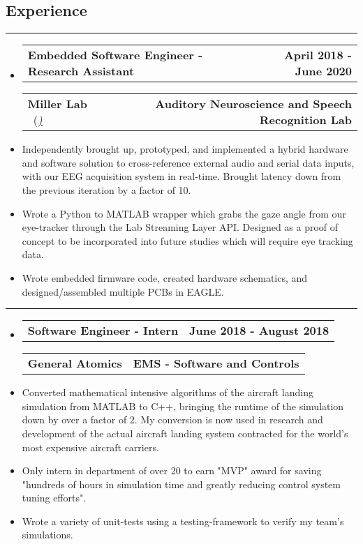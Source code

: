 \documentclass[10pt,letterpaper]{article}
\makeatletter
\newcommand{\items}[2]
{
	\begin{tabular*}{\linewidth}{l @{\extracolsep{\fill}} r}
		#1 & #2 \\
	\end{tabular*}
}
\newcommand{\sectionbreak}
{
	\vspace{-1.2em}
	\rule{\textwidth}{1.7pt}
	\vspace{-1.7em}
}
\makeatother
\begin{document}
\vspace{-1.5em}

\subsection*{Experience}
\sectionbreak



\begin{itemize}
	\item[]
		\items
			{\textbf{Embedded Software Engineer - Research Assistant}} 
			{\textbf{April 2018 - June 2020}}
		\items
		{\textbf{Miller Lab} \ (\href{https://millerlab.faculty.ucdavis.edu}{\small \emph{\underline{\smash{millerlab.faculty.ucdavis.edu})}}} }
			{\textbf{Auditory Neuroscience and Speech Recognition Lab}} 
		\item
			Independently brought up, prototyped, and implemented a hybrid hardware and software solution to cross-reference external audio and serial data inputs, with our EEG acquisition system in real-time. Brought latency down from the previous iteration by a factor of 10. 
		\item 
			Wrote a Python to MATLAB wrapper which grabs the gaze angle from our eye-tracker through the Lab Streaming Layer API. Designed as a proof of concept to be incorporated into future studies which will require eye tracking data.
		\item
			Wrote embedded firmware code, created hardware schematics, and designed/assembled multiple PCBs in EAGLE.
\end{itemize}

\hrule

\begin{itemize}
	\item[]
		\items
			{\textbf{Software Engineer - Intern}} 
			{\textbf{June 2018 - August 2018}}
		\items
			{\textbf{General Atomics}}
			{\textbf{EMS - Software and Controls}} 
		\item
			Converted mathematical intensive algorithms of the aircraft landing simulation from MATLAB to C++, bringing the runtime of the simulation down by over a factor of 2. My conversion is now used in research and development of the actual aircraft landing system contracted for the world’s most expensive aircraft carriers.
		\item
			Only intern in department of over 20 to earn "MVP" award for saving "hundreds of hours in simulation time and greatly reducing control system tuning efforts".
		\item
			Wrote a variety of unit-tests using a testing-framework to verify my team's simulations.

\end{itemize}
\end{document}

